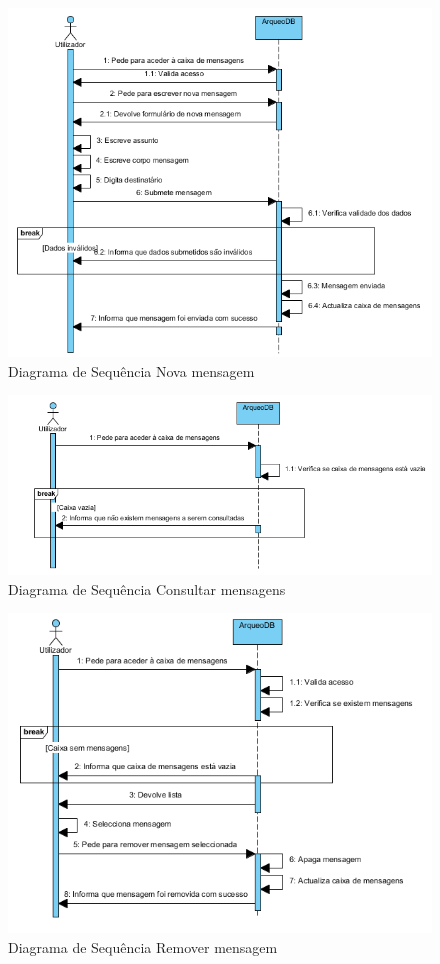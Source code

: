 ﻿\documentclass[12pt,a4paper]{article}
\begin{document}
\begin{figure}[h!]
\centering
\includegraphics[scale=1]{sequencia/enviarmensagem}
\caption{Diagrama de Sequência Nova mensagem} 
\end{figure}

\begin{figure}[h!]
\centering
\includegraphics[scale=0.8]{sequencia/consultarmensagem}
\caption{Diagrama de Sequência Consultar mensagens} 
\end{figure}

\begin{figure}[h!]
\centering
\includegraphics[scale=0.8]{sequencia/apagarmensagem}
\caption{Diagrama de Sequência Remover mensagem} 
\end{figure}
\end{document}
